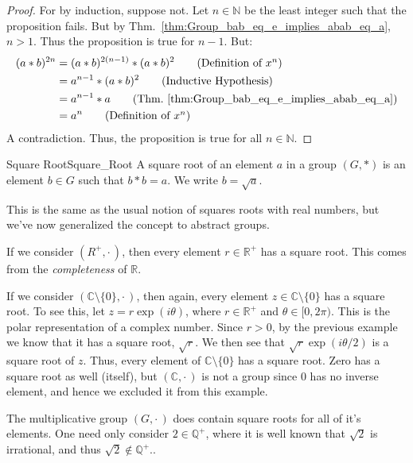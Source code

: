     \begin{proof}
        For by induction, suppose not. Let $n\in\mathbb{N}$ be the least
        integer such that the proposition fails. But by
        Thm.~\ref{thm:Group_bab_eq_e_implies_abab_eq_a}, $n>1$. Thus the
        proposition is true for $n-1$. But:
        \begin{align}
            (a*b)^{2n}&=(a*b)^{2(n-1)}*(a*b)^{2}
            \tag{Definition of $x^{n}$}\\
            &=a^{n-1}*(a*b)^{2}
            \tag{Inductive Hypothesis}\\
            &=a^{n-1}*a
            \tag{Thm.~\ref{thm:Group_bab_eq_e_implies_abab_eq_a}}\\
            &=a^{n}
            \tag{Definition of $x^{n}$}
        \end{align}
        A contradiction. Thus, the proposition is true for all $n\in\mathbb{N}$.
    \end{proof}
    \begin{fdefinition}{Square Root}{Square_Root}
        A square root of an element $a$ in a \gls{group} $(G,*)$ is an element
        $b\in{G}$ such that $b*b=a$. We write $b=\sqrt{a}$.
    \end{fdefinition}
    This is the same as the usual notion of squares roots with real numbers, but
    we've now generalized the concept to abstract groups.
    \begin{example}
        If we consider $(R^{+},\cdot\,)$, then every element
        $r\in\mathbb{R}^{+}$ has a square root. This comes from the
        \textit{completeness} of $\mathbb{R}$.
    \end{example}
    \begin{example}
        If we consider $(\mathbb{C}\setminus\{0\},\cdot\,)$, then again, every
        element $z\in\mathbb{C}\setminus\{0\}$ has a square root. To see this,
        let $z=r\exp(i\theta)$, where $r\in\mathbb{R}^{+}$ and
        $\theta\in[0,2\pi)$. This is the polar representation of a complex
        number. Since $r>0$, by the previous example we know that it has a
        square root, $\sqrt{r}$. We then see that $\sqrt{r}\exp(i\theta/2)$ is a
        square root of $z$. Thus, every element of $\mathbb{C}\setminus\{0\}$
        has a square root. Zero has a square root as well (itself), but
        $(\mathbb{C},\cdot\,)$ is not a group since $0$ has no inverse element,
        and hence we excluded it from this example.
    \end{example}
    \begin{example}
        The multiplicative group $(G,\cdot\,)$ does contain square roots for all
        of it's elements. One need only consider $2\in\mathbb{Q}^{+}$, where it
        is well known that $\sqrt{2}$ is irrational, and thus
        $\sqrt{2}\notin\mathbb{Q}^{+}$..
    \end{example}
